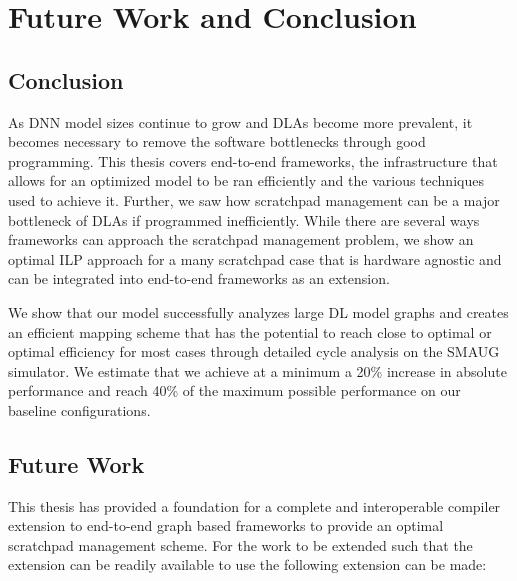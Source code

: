 \chapter{Future Work and Conclusion} %

\label{Chapter8} %

\section{Conclusion}
As DNN model sizes continue to grow and DLAs become more prevalent, it becomes
necessary to remove the software bottlenecks through good programming.  This
thesis covers end-to-end frameworks, the infrastructure that allows for an
optimized model to be ran efficiently and the various techniques used to
achieve it. Further, we saw how scratchpad management can be a major bottleneck
of DLAs if programmed inefficiently. While there are several ways frameworks
can approach the scratchpad management problem, we show an optimal ILP approach
for a many scratchpad case that is hardware agnostic and can be integrated into
end-to-end frameworks as an extension.

We show that our model successfully analyzes large DL model graphs and creates
an efficient mapping scheme that has the potential to reach close to optimal
or optimal efficiency for most cases through detailed cycle analysis on the SMAUG
simulator. We estimate that we achieve at a minimum a 20\% increase in absolute
performance and reach 40\% of the maximum possible performance on our baseline
configurations.

\section{Future Work}


This thesis has provided a foundation for a complete and interoperable compiler
extension to end-to-end graph based frameworks to provide an optimal scratchpad
management scheme. For the work to be extended such that the extension can be readily
available to use the following extension can be made:


